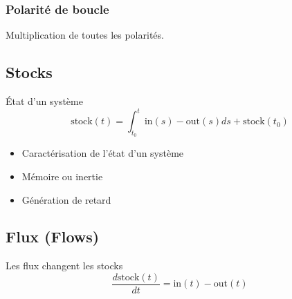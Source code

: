 \documentclass[resume]{subfiles}
\begin{document}
\subsubsection{Polarité de boucle}
Multiplication de toutes les polarités.
\subsection{Stocks}
État d'un système
$$\text{stock}(t)=\int_{t_0}^{t}\text{in}(s)-\text{out}(s)ds+\text{stock}(t_0)$$
\begin{itemize}
\item Caractérisation de l'état d'un système
\item Mémoire ou inertie
\item Génération de retard
\end{itemize}
\subsection{Flux (Flows)}
Les flux changent les stocks
$$\frac{d\text{stock}(t)}{dt}=\text{in}(t)-\text{out}(t)$$
\end{document}
